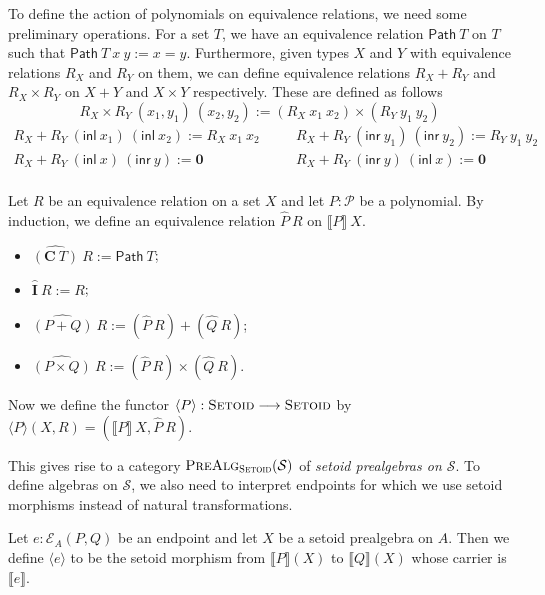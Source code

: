 \documentclass[9pt]{entcs}
\newcommand{\term}[1]{\mathsf{#1}}
\newcommand{\constructor}[1]{\mathbf{#1}}
\newcommand{\category}[1]{\textsc{#1}}
\newcommand{\function}[1]{\mathsf{#1}}
\newcommand{\0}{\textbf{0}} %
\newcommand{\inl}{\term{inl}} %
\newcommand{\inr}{\term{inr}} %
\newcommand{\Def}{:=} %
\newcommand{\setoids}{\category{Setoid}} %
\newcommand{\functor}[2]{#1 \longrightarrow #2} %
\newcommand{\poly}{\mathcal{P}} %
\newcommand{\C}{\constructor{C}} %
\newcommand{\I}{\constructor{I}} %
\newcommand{\sumP}[2]{#1 + #2} %
\newcommand{\prodP}[2]{#1 \times #2} %
\newcommand{\pathR}[1]{\function{Path} \> #1} %
\newcommand{\sumR}[2]{#1 + #2} %
\newcommand{\prodR}[2]{#1 \times #2} %
\newcommand{\polyR}[2]{\widehat{#1} \> #2} %
\newcommand{\ep}[3]{\mathcal{E}_{#1}(#2,#3)} %
\newcommand{\sig}{\mathcal{S}} %
\newcommand{\semP}[1]{\llbracket #1 \rrbracket} %
\newcommand{\semE}[1]{\llbracket #1 \rrbracket} %
\newcommand{\semPT}[1]{\langle #1 \rangle} %
\newcommand{\semET}[1]{\langle #1 \rangle} %
\newcommand{\prealgst}[1]{\category{PreAlg}_{\setoids}(#1)} %
\begin{document}
To define the action of polynomials on equivalence relations, we need some preliminary operations.
For a set $T$, we have an equivalence relation $\pathR{T}$ on $T$ such that $\pathR{T} \> x \> y \Def x = y$.
Furthermore, given types $X$ and $Y$ with equivalence relations $R_X$ and $R_Y$ on them, we can define equivalence relations $\sumR{R_X}{R_Y}$ and $\prodR{R_X}{R_Y}$ on $X + Y$ and $X \times Y$ respectively.
These are defined as follows
\[
\prodR{R_X}{R_Y} \> (x_1,y_1) \> (x_2,y_2) \Def (R_X \> x_1 \> x_2) \times (R_Y \> y_1 \> y_2)
\]
\[
\begin{array}{ccc}
\sumR{R_X}{R_Y} \> (\inl \> x_1) \> (\inl \> x_2) \Def R_X \> x_1 \> x_2 & \quad & \sumR{R_X}{R_Y} \> (\inr \> y_1) \> (\inr \> y_2) \Def R_Y \> y_1 \> y_2\\
\sumR{R_X}{R_Y} \> (\inl \> x) \> (\inr \> y) \Def \0 & \quad & \sumR{R_X}{R_Y} \> (\inr \> y) \> (\inl \> x) \Def \0\\ 
\end{array}
\]

\begin{definition}
Let $R$ be an equivalence relation on a set $X$ and let $P : \poly$ be a polynomial.
By induction, we define an equivalence relation $\polyR{P}{R}$ on $\semP{P} \> X$.
\begin{itemize}
	\item $\polyR{(\C \> T)}{R} \Def \pathR{T}$;
	\item $\polyR{\I}{R} \Def R$;
	\item $\polyR{(\sumP{P}{Q})}{R} \Def \sumR{(\polyR{P}{R})}{(\polyR{Q}{R})}$;
	\item $\polyR{(\prodP{P}{Q})}{R} \Def \prodR{(\polyR{P}{R})}{(\polyR{Q}{R})}$.
\end{itemize}
Now we define the functor $\semPT{P} : \functor{\setoids}{\setoids}$ by $\semPT{P}(X,R) = (\semP{P} \> X, \polyR{P}{R})$.
\end{definition}

This gives rise to a category $\prealgst{\sig}$ of \emph{setoid prealgebras on $\sig$}.
To define algebras on $\sig$, we also need to interpret endpoints for which we use setoid morphisms instead of natural transformations.

\begin{definition}
Let $e : \ep{A}{P}{Q}$ be an endpoint and let $X$ be a setoid prealgebra on $A$.
Then we define $\semET{e}$ to be the setoid morphism from $\semE{P}(X)$ to $\semE{Q}(X)$ whose carrier is $\semP{e}$.
\end{definition}
\end{document}
